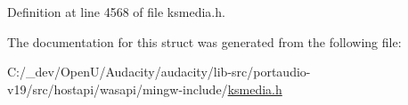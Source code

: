 Definition at line 4568 of file ksmedia.\+h.



The documentation for this struct was generated from the following file\+:\begin{DoxyCompactItemize}
\item 
C\+:/\+\_\+dev/\+Open\+U/\+Audacity/audacity/lib-\/src/portaudio-\/v19/src/hostapi/wasapi/mingw-\/include/\hyperlink{ksmedia_8h}{ksmedia.\+h}\end{DoxyCompactItemize}
